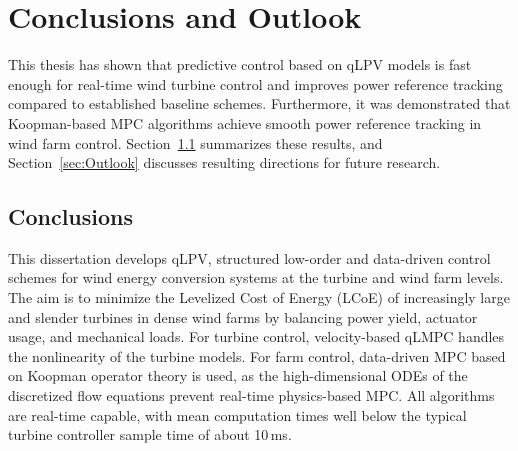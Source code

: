 \chapter{Conclusions and Outlook} \label{Conclusions}
This thesis has shown that predictive control based on qLPV models is fast enough for real-time wind turbine control and improves power reference tracking compared to established baseline schemes. Furthermore, it was demonstrated that Koopman-based MPC algorithms achieve smooth power reference tracking in wind farm control. Section~\ref{sec:Conclusions} summarizes these results, and Section~\ref{sec:Outlook} discusses resulting directions for future research.
\section{Conclusions}\label{sec:Conclusions}
This dissertation develops qLPV, structured low-order and data-driven control schemes for wind energy conversion systems at the turbine and wind farm levels. The aim is to minimize the Levelized Cost of Energy (LCoE) of increasingly large and slender turbines in dense wind farms by balancing power yield, actuator usage, and mechanical loads. For turbine control, velocity-based qLMPC handles the nonlinearity of the turbine models. For farm control, data-driven MPC based on Koopman operator theory is used, as the high-dimensional ODEs of the discretized flow equations prevent real-time physics-based MPC. All algorithms are real-time capable, with mean computation times well below the typical turbine controller sample time of about 10\,ms.

